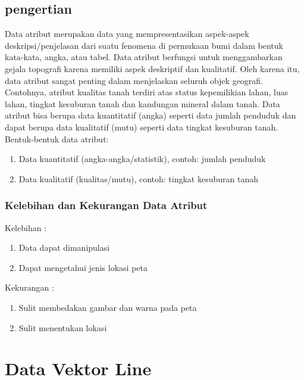 \subsection{pengertian}
Data atribut merupakan data yang mempresentasikan aspek-aspek deskripsi/penjelasan 
dari suatu fenomena di permukaan bumi dalam bentuk kata-kata, angka, atau tabel. 
Data atribut berfungsi untuk menggambarkan gejala topografi karena memiliki aspek deskriptif dan kualitatif. 
Oleh karena itu, data atribut sangat penting dalam menjelaskan seluruh objek geografi. 
Contohnya, atribut kualitas tanah terdiri atas status kepemilikian lahan, luas lahan, 
tingkat kesuburan tanah dan kandungan mineral dalam tanah. 
Data atribut bisa berupa data kuantitatif (angka) seperti data jumlah penduduk dan dapat berupa data kualitatif (mutu) 
seperti data tingkat kesuburan tanah.  
Bentuk-bentuk data atribut:
\begin{enumerate}
\item	Data kuantitatif (angka-angka/statistik), contoh: jumlah penduduk
\item	Data kualitatif (kualitas/mutu), contoh: tingkat kesuburan tanah
\end{enumerate}

\subsubsection{Kelebihan dan Kekurangan Data Atribut}
Kelebihan :
\begin{enumerate}
   \item Data dapat dimanipulasi 
   \item Dapat mengetahui jenis lokasi peta
\end{enumerate}
Kekurangan :
\begin{enumerate}
   \item Sulit membedakan gambar dan warna pada peta
   \item Sulit menentukan lokasi
\end{enumerate}

\section{Data Vektor Line}
